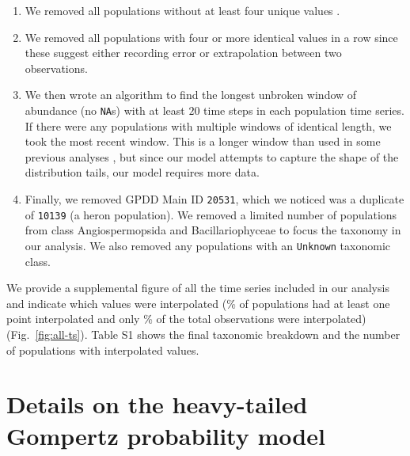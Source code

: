\begin{enumerate}
\item We removed all populations without at least four unique values
  \citep[following][]{brook2006a}.

\item We removed all populations with four or more identical values in a row
  since these suggest either recording error or extrapolation between two
  observations.

\item We then wrote an algorithm to find the longest unbroken window of
  abundance (no \texttt{NA}s) with at least $20$ time steps in each population
  time series. If there were any populations with multiple windows of identical
  length, we took the most recent window. This is a longer window than used in
  some previous analyses \citep[e.g.][]{brook2006a}, but since our model
  attempts to capture the shape of the distribution tails, our model requires
  more data.

\item Finally, we removed GPDD Main ID \texttt{20531}, which we noticed was
  a duplicate of \texttt{10139} (a heron population). We removed a limited
  number of populations from class Angiospermopsida and Bacillariophyceae to
  focus the taxonomy in our analysis. We also removed any populations with an
  \texttt{Unknown} taxonomic class.

\end{enumerate}

\noindent
We provide a supplemental figure of all the time series included in our analysis
and indicate which values were interpolated (\percImputedPops\% of populations
had at least one point interpolated and only \percImputedPoints\% of the total
observations were interpolated) (Fig.~\ref{fig:all-ts}). Table S1 shows the
final taxonomic breakdown and the number of populations with interpolated
values.

\section{Details on the heavy-tailed Gompertz probability model}

